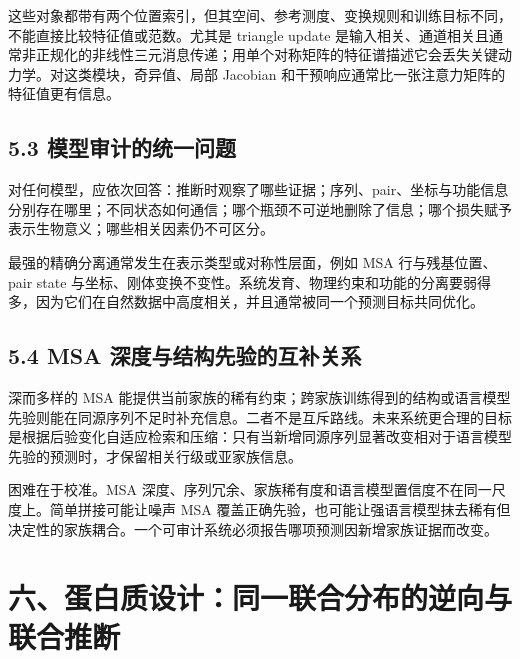 \documentclass[10pt]{article}
\begin{document}
这些对象都带有两个位置索引，但其空间、参考测度、变换规则和训练目标不同，不能直接比较特征值或范数。尤其是 triangle update 是输入相关、通道相关且通常非正规化的非线性三元消息传递；用单个对称矩阵的特征谱描述它会丢失关键动力学。对这类模块，奇异值、局部 Jacobian 和干预响应通常比一张注意力矩阵的特征值更有信息。\par

\subsection*{5.3 模型审计的统一问题}


对任何模型，应依次回答：推断时观察了哪些证据；序列、pair、坐标与功能信息分别存在哪里；不同状态如何通信；哪个瓶颈不可逆地删除了信息；哪个损失赋予表示生物意义；哪些相关因素仍不可区分。\par

最强的精确分离通常发生在表示类型或对称性层面，例如 MSA 行与残基位置、pair state 与坐标、刚体变换不变性。系统发育、物理约束和功能的分离要弱得多，因为它们在自然数据中高度相关，并且通常被同一个预测目标共同优化。\par

\subsection*{5.4 MSA 深度与结构先验的互补关系}


深而多样的 MSA 能提供当前家族的稀有约束；跨家族训练得到的结构或语言模型先验则能在同源序列不足时补充信息。二者不是互斥路线。未来系统更合理的目标是根据后验变化自适应检索和压缩：只有当新增同源序列显著改变相对于语言模型先验的预测时，才保留相关行级或亚家族信息。\par

困难在于校准。MSA 深度、序列冗余、家族稀有度和语言模型置信度不在同一尺度上。简单拼接可能让噪声 MSA 覆盖正确先验，也可能让强语言模型抹去稀有但决定性的家族耦合。一个可审计系统必须报告哪项预测因新增家族证据而改变。\par

\section*{六、蛋白质设计：同一联合分布的逆向与联合推断}

\end{document}
